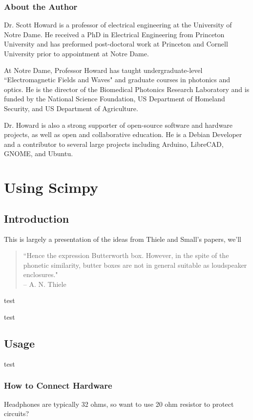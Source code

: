 \documentclass[10pt]{book}
\begin{document}
\section*{About the Author}
Dr. Scott Howard is a professor of electrical engineering at the University of Notre Dame. He received a PhD in Electrical Engineering from Princeton University and has preformed post-doctoral work at Princeton and Cornell University prior to appointment at Notre Dame.

At Notre Dame, Professor Howard has taught undergraduate-level ``Electromagnetic Fields and Waves" and graduate courses in photonics and optics. He is the director of the Biomedical Photonics Research Laboratory and is funded by the National Science Foundation, US Department of Homeland Security, and US Department of Agriculture.

Dr. Howard is also a strong supporter of open-source software and hardware projects, as well as open and collaborative education. He is a Debian Developer and a contributor to several large projects including Arduino, LibreCAD, GNOME, and Ubuntu.


\mainmatter
\part{Using Scimpy}
\chapter{Introduction}

This is largely a presentation of the ideas from Thiele and Small's papers, we'll 

\begin{quote}
``Hence the expression Butterworth box. However, in the spite of the phonetic similarity, butter boxes are not in general suitable as loudspeaker enclosures." \\-- A. N. Thiele
\end{quote}
test

test

\chapter{Usage}
test
\section{How to Connect Hardware}
Headphones are typically 32 ohms, so want to use 20 ohm resistor to protect circuits?
\end{document}
